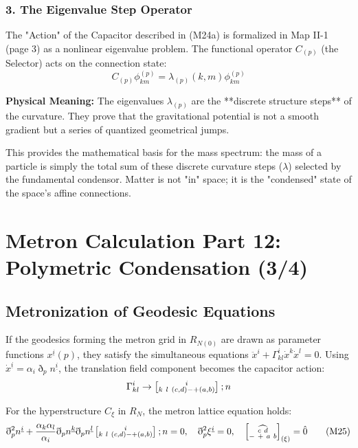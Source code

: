 \documentclass[11pt,a4paper,oneside]{article}
\newcommand{\ethop}{\eth}
\newcommand{\metroncap}[4][]{%
    \left[ \renewcommand{\arraystretch}{0.85} \substack{#2 \\ #3 \ #4} \right]_{#1}%
}
\begin{document}
\subsubsection*{3. The Eigenvalue Step Operator}
The "Action" of the Capacitor described in (M24a) is formalized in Map II-1 (page 3) as a nonlinear eigenvalue problem. The functional operator $C_{(p)}$ (the Selector) acts on the connection state:
\begin{equation}
    C_{(p)} \phi_{km}^{(p)} = \lambda_{(p)}(k, m) \phi_{km}^{(p)}
\end{equation}
\begin{mbbcite}
    \textbf{Physical Meaning:} The eigenvalues $\lambda_{(p)}$ are the **discrete structure steps** of the curvature. They prove that the gravitational potential is not a smooth gradient but a series of quantized geometrical jumps.
\end{mbbcite}
This provides the mathematical basis for the mass spectrum: the mass of a particle is simply the total sum of these discrete curvature steps ($\lambda$) selected by the fundamental condensor. Matter is not "in" space; it is the "condensed" state of the space's affine connections. 
\section{Metron Calculation Part 12: Polymetric Condensation (3/4)}

\subsection{Metronization of Geodesic Equations}

If the geodesics forming the metron grid in $R_{N(0)}$ are drawn as parameter functions $x^{\underline{i}}(p)$, they satisfy the simultaneous equations $\ddot{x}^i + \Gamma^i_{kl}\dot{x}^k\dot{x}^l = 0$. Using $\dot{x}^{\underline{i}} = \alpha_i \ethop_p n^{\underline{i}}$, the translation field component becomes the capacitor action:
\begin{equation*}
  \Gamma^i_{kl} \to \metroncap{i}{k\ l}{(c,d) - + (a,b)}; n
\end{equation*}

For the hyperstructure $C_\xi$ in $R_N$, the metron lattice equation holds:
\begin{equation}
    \ethop^2_p n^{\underline{i}} + \frac{\alpha_k \alpha_l}{\alpha_i} \ethop_p n^{\underline{k}} \ethop_p n^{\underline{l}} \metroncap{i}{k\ l}{(c,d) - + (a,b)}; n = 0, \quad \ethop^2_p \xi^{\underline{i}} = 0, \quad \metroncap[(\xi)]{\widehat{c \ d}}{- \ +}{a \ b} = \hat{0} \tag{M25}
\end{equation}
\end{document}
